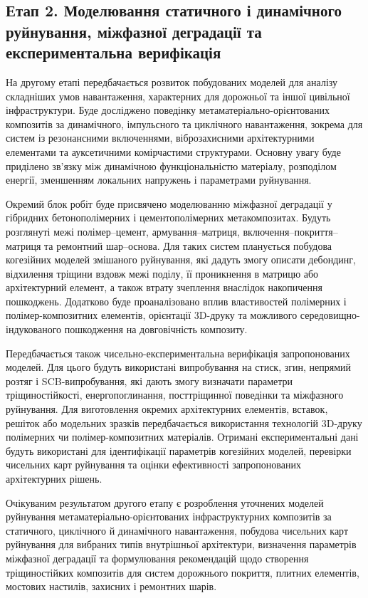 \documentclass[12pt,a4paper]{article}
\begin{document}
\subsection*{Етап 2. Моделювання статичного і динамічного руйнування, міжфазної деградації та експериментальна верифікація}

На другому етапі передбачається розвиток побудованих моделей для аналізу складніших умов навантаження, характерних для дорожньої та іншої цивільної інфраструктури. Буде досліджено поведінку метаматеріально-орієнтованих композитів за динамічного, імпульсного та циклічного навантаження, зокрема для систем із резонансними включеннями, віброзахисними архітектурними елементами та ауксетичними комірчастими структурами. Основну увагу буде приділено зв'язку між динамічною функціональністю матеріалу, розподілом енергії, зменшенням локальних напружень і параметрами руйнування.

Окремий блок робіт буде присвячено моделюванню міжфазної деградації у гібридних бетонополімерних і цементополімерних метакомпозитах. Будуть розглянуті межі полімер--цемент, армування--матриця, включення--покриття--матриця та ремонтний шар--основа. Для таких систем планується побудова когезійних моделей змішаного руйнування, які дадуть змогу описати дебондинг, відхилення тріщини вздовж межі поділу, її проникнення в матрицю або архітектурний елемент, а також втрату зчеплення внаслідок накопичення пошкоджень. Додатково буде проаналізовано вплив властивостей полімерних і полімер-композитних елементів, орієнтації 3D-друку та можливого середовищно-індукованого пошкодження на довговічність композиту.

Передбачається також чисельно-експериментальна верифікація запропонованих моделей. Для цього будуть використані випробування на стиск, згин, непрямий розтяг і SCB-випробування, які дають змогу визначати параметри тріщиностійкості, енергопоглинання, посттріщинної поведінки та міжфазного руйнування. Для виготовлення окремих архітектурних елементів, вставок, решіток або модельних зразків передбачається використання технологій 3D-друку полімерних чи полімер-композитних матеріалів. Отримані експериментальні дані будуть використані для ідентифікації параметрів когезійних моделей, перевірки чисельних карт руйнування та оцінки ефективності запропонованих архітектурних рішень.

Очікуваним результатом другого етапу є розроблення уточнених моделей руйнування метаматеріально-орієнтованих інфраструктурних композитів за статичного, циклічного й динамічного навантаження, побудова чисельних карт руйнування для вибраних типів внутрішньої архітектури, визначення параметрів міжфазної деградації та формулювання рекомендацій щодо створення тріщиностійких композитів для систем дорожнього покриття, плитних елементів, мостових настилів, захисних і ремонтних шарів.
\end{document}
